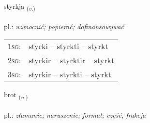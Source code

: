 \documentclass[frontgrid, backgrid]{flacards}\usepackage[]{graphicx}\usepackage[]{xcolor}
\begin{document}
\renewcommand{\blhead}{\vskip5pt {\small\bfseries\footnotesize Sagnorð | Verb }}
\renewcommand{\bcfoot}{\vskip5pt \hspace{2pt}{\small\bfseries\footnotesize 1K}}


{styrkja \small{\textsubscript{(\textit{v.})}} \\[1ex] %
\textphonetic{[stɪr̥ca]} \\
pl.: \emph{wzmocnić; popierać; dofinansowywać} \\  [2ex]
\renewcommand*{\arraystretch}{0.8}
\begin{tabular}{p{1cm}l}
\textsc{1sg}: & styrki -- styrkti -- styrkt \\ 
\textsc{2sg}: & styrkir -- styrktir -- styrkt \\ 
\textsc{3sg}: & styrkir -- styrkti -- styrkt \\ 
\end{tabular}
}

\renewcommand{\flhead}{\vskip5pt \fboxsep=0pt {\small\bfseries\footnotesize Nafnorð | Noun}}
\renewcommand{\fcfoot}{\vskip5pt \fboxsep=0pt \hspace{2pt}{\small\bfseries\footnotesize 1K}}

\renewcommand{\blhead}{\vskip5pt {\small\bfseries\footnotesize Nafnorð | Noun }}
\renewcommand{\bcfoot}{\vskip5pt \hspace{2pt}{\small\bfseries\footnotesize 1K}}


{brot \small{\textsubscript{(\textit{n.})}} \\[1ex] %
\textphonetic{[prɔːt]} \\
pl.: \emph{złamanie; naruszenie; format; część, frakcja} \\  [2ex]
\renewcommand*{\arraystretch}{0.8}
}
\end{document}
